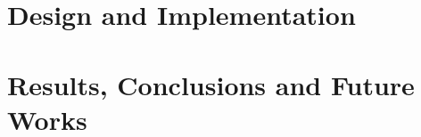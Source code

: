 \documentclass[letterpaper,11pt,oneside,final]{uicthesis}
\theoremstyle{mythstyle}
\begin{document}
	\chapter{Design and Implementation}
		\label{cha:hacking_llvm}
		

% 		

\chapter{Results, Conclusions and Future Works}
	\label{cha:conclusions}
	

	\clearpage
	\appendices
		\appendix \label{app:a}
		

	\clearpage
	\bib
	
	\nocite{*}

	\newpage

	
\end{document}
